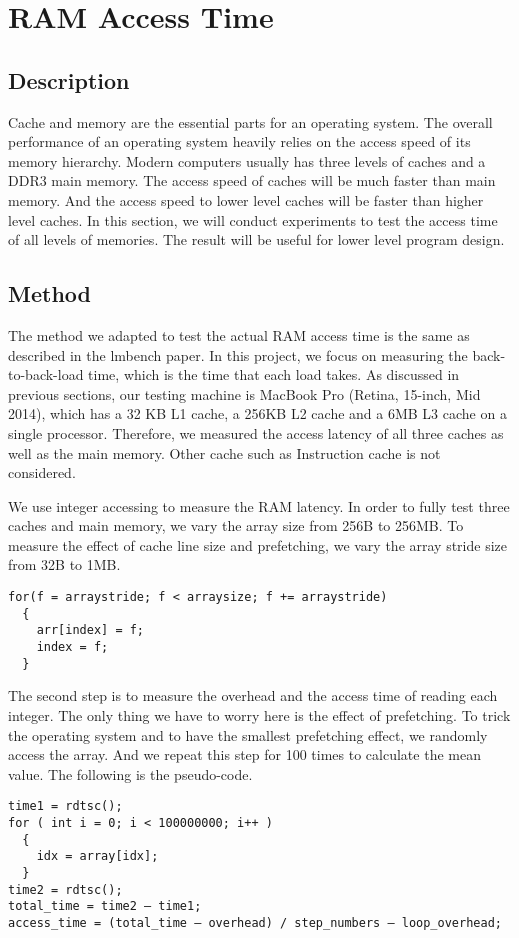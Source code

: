 \newpage
\section{RAM Access Time}

\subsection{Description}
Cache and memory are the essential parts for an operating system. The overall performance of an operating system heavily relies on the access speed of its memory hierarchy. Modern computers usually has three levels of caches and a DDR3 main memory. The access speed of caches will be much faster than main memory. And the access speed to lower level caches will be faster than higher level caches. In this section, we will conduct experiments to test the access time of all levels of memories. The result will be useful for lower level program design. 

\subsection{Method}
The method we adapted to test the actual RAM access time is the same as described in the lmbench paper. In this project, we focus on measuring the back-to-back-load time, which is the time that each load takes. As discussed in previous sections, our testing machine is MacBook Pro (Retina, 15-inch, Mid 2014), which has a 32 KB L1 cache, a 256KB L2 cache and a 6MB L3 cache on a single processor. Therefore, we measured the access latency of all three caches as well as the main memory. Other cache such as Instruction cache is not considered.  

We use integer accessing to measure the RAM latency. In order to fully test three caches and main memory, we vary the array size from 256B to 256MB. To measure the effect of cache line size and prefetching, we vary the array stride size from 32B to 1MB.
\begin{lstlisting}
for(f = arraystride; f < arraysize; f += arraystride)
  {
    arr[index] = f;
    index = f;
  }
\end{lstlisting}

The second step is to measure the overhead and the access time of reading each integer. The only thing we have to worry here is the effect of prefetching. To trick the operating system and to have the smallest prefetching effect, we randomly access the array. And we repeat this step for 100 times to calculate the mean value. The following is the pseudo-code.
\begin{lstlisting}
time1 = rdtsc();
for ( int i = 0; i < 100000000; i++ ) 
  {
    idx = array[idx];
  }
time2 = rdtsc();
total_time = time2 – time1;
access_time = (total_time – overhead) / step_numbers – loop_overhead;
\end{lstlisting}


